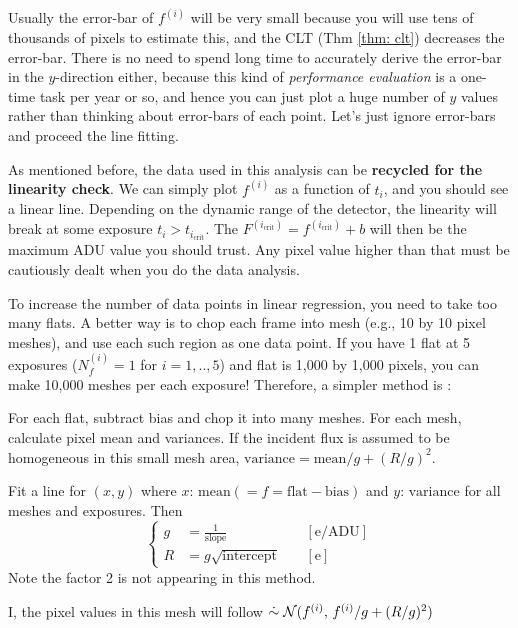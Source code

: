 Usually the error-bar of $ f^{(i)} $ will be very small because you will use tens of thousands of pixels to estimate this, and the CLT (Thm \ref{thm: clt}) decreases the error-bar. There is no need to spend long time to accurately derive the error-bar in the $ y $-direction either, because this kind of \textit{performance evaluation} is a one-time task per year or so, and hence you can just plot a huge number of $ y $ values rather than thinking about error-bars of each point. Let's just ignore error-bars and proceed the line fitting.

As mentioned before, the data used in this analysis can be \textbf{recycled for the linearity check}. We can simply plot $ f^{(i)} $ as a function of $ t_i $, and you should see a linear line. Depending on the dynamic range of the detector, the linearity will break at some exposure $ t_i > t_{i_\mathrm{crit}} $. The $ F^{(i_\mathrm{crit})} = f^{(i_\mathrm{crit})} + b $ will then be the maximum ADU value you should trust. Any pixel value higher than that must be cautiously dealt when you do the data analysis.


To increase the number of data points in linear regression, you need to take too many flats. A better way is to chop each frame into mesh (e.g., 10 by 10 pixel meshes), and use each such region as one data point. If you have 1 flat at 5 exposures ($ N_f^{(i)} = 1 $ for $ i = 1, .., 5 $) and flat is 1,000 by 1,000 pixels, you can make 10,000 meshes per each exposure! Therefore, a simpler method is :

\begin{thm} 
For each flat, subtract bias and chop it into many meshes. For each mesh, calculate pixel mean and variances. If the incident flux is assumed to be homogeneous in this small mesh area, $ \mathrm{variance} = \mathrm{mean}/g + (R/g)^2 $.

Fit a line for $ (x, y) $ where $ x $: $ \mathrm{mean} (= f = \mathrm{flat} - \mathrm{bias}) $ and $ y $: $ \mathrm{variance} $ for all meshes and exposures. Then
\begin{equation}
  \left \{
  \begin{aligned}
    g &= \frac{1}{\mathrm{slope}} &&~\mathrm{[e/ADU]} \\
    R &= g \sqrt{\mathrm{intercept}} &&~\mathrm{[e]}
  \end{aligned}
  \right .
\end{equation}
Note the factor 2 is not appearing in this method.
\end{thm}
I, the pixel values in this mesh will follow $ \mathrel{\dot{\sim}} \mathcal{N} (f^{(i)},\, f^{(i)}/g + (R/g)^2 ) $



